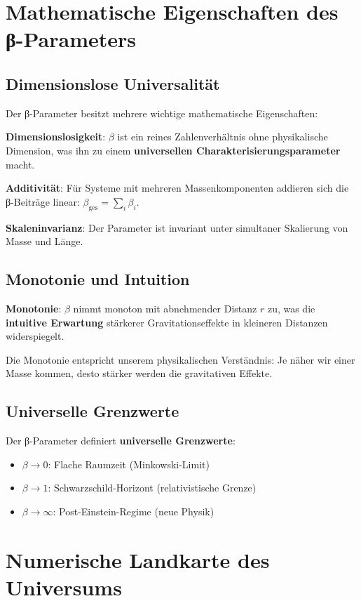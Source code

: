 \documentclass[12pt,a4paper]{report}
\begin{document}
\section{Mathematische Eigenschaften des β-Parameters}

\subsection{Dimensionslose Universalität}

Der β-Parameter besitzt mehrere wichtige mathematische Eigenschaften:

\textbf{Dimensionslosigkeit}: $\beta$ ist ein reines Zahlenverhältnis ohne physikalische Dimension, was ihn zu einem \textbf{universellen Charakterisierungsparameter} macht.

\textbf{Additivität}: Für Systeme mit mehreren Massenkomponenten addieren sich die β-Beiträge linear: $\beta_{\text{ges}} = \sum_i \beta_i$.

\textbf{Skaleninvarianz}: Der Parameter ist invariant unter simultaner Skalierung von Masse und Länge.

\subsection{Monotonie und Intuition}

\textbf{Monotonie}: $\beta$ nimmt monoton mit abnehmender Distanz $r$ zu, was die \textbf{intuitive Erwartung} stärkerer Gravitationseffekte in kleineren Distanzen widerspiegelt.

Die Monotonie entspricht unserem physikalischen Verständnis: Je näher wir einer Masse kommen, desto stärker werden die gravitativen Effekte.

\subsection{Universelle Grenzwerte}

Der β-Parameter definiert \textbf{universelle Grenzwerte}:

\begin{itemize}
	\item $\beta \to 0$: Flache Raumzeit (Minkowski-Limit)
	\item $\beta \to 1$: Schwarzschild-Horizont (relativistische Grenze)
	\item $\beta \to \infty$: Post-Einstein-Regime (neue Physik)
\end{itemize}

\section{Numerische Landkarte des Universums}
\end{document}
